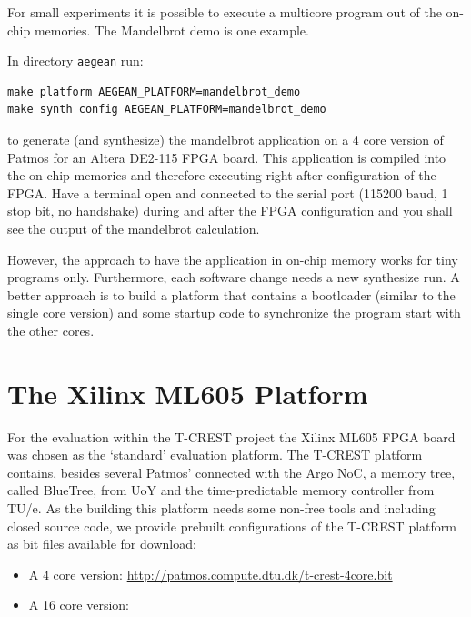 \documentclass[a4paper,fontsize=10pt,twoside,DIV15,BCOR12mm,headinclude=true,footinclude=false,pagesize,bibtotoc]{scrbook}
\newcommand{\code}[1]{{\texttt{#1}}}
\begin{document}
For small experiments it is possible to execute a multicore program out
of the on-chip memories. The Mandelbrot demo is one example.

In directory \code{aegean} run:

\begin{verbatim}
make platform AEGEAN_PLATFORM=mandelbrot_demo
make synth config AEGEAN_PLATFORM=mandelbrot_demo
\end{verbatim}

to generate (and synthesize) the mandelbrot application on a 4 core
version of Patmos for an Altera DE2-115 FPGA board. This application is compiled
into the on-chip memories and therefore executing right after configuration of the
FPGA. Have a terminal open and connected to the serial port (115200 baud, 1 stop bit,
no handshake) during and after the FPGA configuration and you shall see the output of
the mandelbrot calculation.

However, the approach to have the application in on-chip memory works for tiny programs
only. Furthermore, each software change needs a new synthesize run. A better approach is
to build a platform that contains a bootloader (similar to the single core version) and some
startup code to synchronize the program start with the other cores.





\section{The Xilinx ML605 Platform}

For the evaluation within the T-CREST project the Xilinx ML605 FPGA board was chosen as the `standard'
evaluation platform. The T-CREST platform contains, besides several Patmos' connected with the Argo NoC,
a memory tree, called BlueTree, from UoY and the time-predictable memory controller from TU/e. As the
building this platform needs some non-free tools and including closed source code, we provide prebuilt
configurations of the T-CREST platform as bit files available for download:

\begin{itemize}
\item A 4 core version: \url{http://patmos.compute.dtu.dk/t-crest-4core.bit}
\item A 16 core version: 
\end{itemize}
\end{document}
